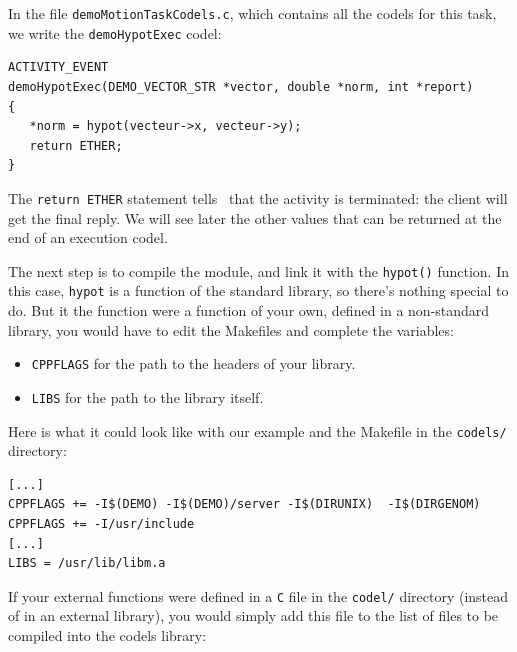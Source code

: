 In the file \texttt{demoMotionTaskCodels.c}, which contains all the codels
for this task, we write the \texttt{demoHypotExec} codel:

\begin{center}\begin{cartouche}\small\begin{verbatim}
ACTIVITY_EVENT
demoHypotExec(DEMO_VECTOR_STR *vector, double *norm, int *report)
{
   *norm = hypot(vecteur->x, vecteur->y);
   return ETHER;
}
\end{verbatim}\end{cartouche}\end{center}

The \texttt{return  ETHER} statement tells   \GenoM\ that  the  activity is
terminated: the client will  get the final  reply. We will see  later the
other values that can be returned at the end of an execution codel.

The next  step is to  compile the   module,  and link   it with the  
\texttt{hypot()} function.  In  this  case, \texttt{hypot} is   a function of   the
standard library, so there's nothing special  to do.  But it the function
were a function of your own, defined in a non-standard library, you would
have to edit the Makefiles and complete the variables:

\begin{itemize}
\item \texttt{CPPFLAGS} for the path to the headers of your library.
\item \texttt{LIBS} for the path to the library itself.
\end{itemize}

Here is what it could look like with our example and the Makefile in the
\texttt{codels/} directory:

\begin{center}\begin{cartouche}\small\begin{verbatim}
[...]
CPPFLAGS += -I$(DEMO) -I$(DEMO)/server -I$(DIRUNIX)  -I$(DIRGENOM)
CPPFLAGS += -I/usr/include
[...]
LIBS = /usr/lib/libm.a
\end{verbatim}\end{cartouche}\end{center}

If your external functions  were defined in a  \texttt{C}  file in the  
\texttt{codel/} directory (instead of  in an external  library), you would simply
add this file to the   list  of files to  be   compiled into the   codels
library:

